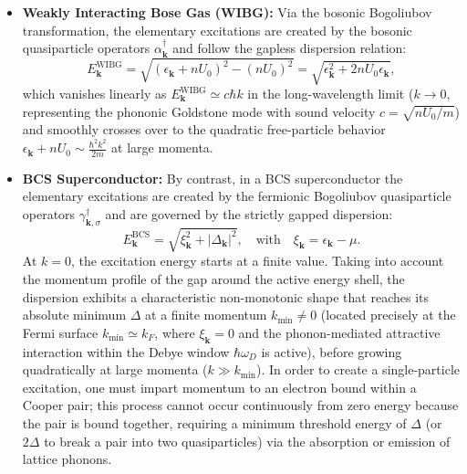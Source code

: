 \begin{itemize}
    \item \textbf{Weakly Interacting Bose Gas (WIBG):} Via the bosonic Bogoliubov transformation, the elementary excitations are created by the bosonic quasiparticle operators \( \alpha_{\mathbf{k}}^\dagger \) and follow the gapless dispersion relation:
          \[
              E_{\mathbf{k}}^{\text{WIBG}} = \sqrt{(\epsilon_{\mathbf{k}} + nU_0)^2 - (nU_0)^2} = \sqrt{\epsilon_{\mathbf{k}}^2 + 2nU_0\epsilon_{\mathbf{k}}},
          \]
          which vanishes linearly as \( E_{\mathbf{k}}^{\text{WIBG}} \simeq c\hbar k \) in the long-wavelength limit (\( k \to 0 \), representing the phononic Goldstone mode with sound velocity \( c = \sqrt{nU_0/m} \)) and smoothly crosses over to the quadratic free-particle behavior \( \epsilon_{\mathbf{k}} + nU_0 \sim \frac{\hbar^2 k^2}{2m} \) at large momenta.
    \item \textbf{BCS Superconductor:} By contrast, in a BCS superconductor the elementary excitations are created by the fermionic Bogoliubov quasiparticle operators \( \gamma_{\mathbf{k},\sigma}^\dagger \) and are governed by the strictly gapped dispersion:
          \[
              E_{\mathbf{k}}^{\text{BCS}} = \sqrt{\xi_{\mathbf{k}}^2 + |\Delta_{\mathbf{k}}|^2}, \quad \text{with} \quad \xi_{\mathbf{k}} = \epsilon_{\mathbf{k}} - \mu.
          \]
          At \( k = 0 \), the excitation energy starts at a finite value. Taking into account the momentum profile of the gap around the active energy shell, the dispersion exhibits a characteristic non-monotonic shape that reaches its absolute minimum \( \Delta \) at a finite momentum \( k_{\text{min}} \neq 0 \) (located precisely at the Fermi surface \( k_{\text{min}} \simeq k_F \), where \( \xi_{\mathbf{k}} = 0 \) and the phonon-mediated attractive interaction within the Debye window \( \hbar\omega_D \) is active), before growing quadratically at large momenta (\( k \gg k_{\text{min}} \)). In order to create a single-particle excitation, one must impart momentum to an electron bound within a Cooper pair; this process cannot occur continuously from zero energy because the pair is bound together, requiring a minimum threshold energy of \( \Delta \) (or \( 2\Delta \) to break a pair into two quasiparticles) via the absorption or emission of lattice phonons.
\end{itemize}


